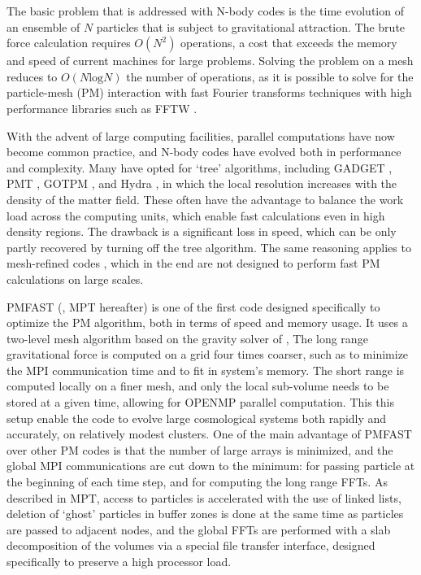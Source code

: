 The basic problem that is addressed with N-body codes is the time evolution of an ensemble of $N$ particles
that is subject to gravitational attraction. The brute force calculation requires $O(N^{2})$ operations, a cost that 
exceeds the memory and speed of current machines for large problems.
Solving the problem  on a mesh \citep{1981csup.book.....H} reduces to $O(N\mbox{log}N)$ the number of operations,
as it is possible to solve for the particle-mesh (PM) interaction with fast Fourier transforms techniques with high performance libraries such as {\small FFTW} \citep{FFTW3}.


With the advent of large computing facilities, parallel computations have now become 
common practice, and N-body codes have evolved both in performance and complexity. 
Many have opted for  `tree' algorithms, including {\small GADGET} \citep{2001NewA....6...79S, 2005MNRAS.364.1105S}, {\small PMT} \citep{1995ApJS...98..355X}, {\small GOTPM} \citep{2004NewA....9..111D}, and Hydra \citep{1995ApJ...452..797C}, in which the local resolution increases with the density of the matter field. 
These often have the advantage to balance the work load across the computing units, which enable fast calculations even in high density regions. 
The drawback is a significant loss in speed, which can be only partly recovered by turning off the tree algorithm. 
The same reasoning applies to mesh-refined codes  \citep{1991ApJ...368L..23C}, 
which in the end are not designed to perform fast PM calculations on large scales. 



{\small PMFAST} (\cite{2005NewA...10..393M}, MPT hereafter) is one of the first code designed specifically to optimize the PM algorithm,
both in terms of speed and memory usage. It uses a two-level mesh algorithm based on the gravity solver of \cite{2003AAS...203.9703T},
The long range gravitational force is computed on a  grid four times coarser, such as to minimize the {\small MPI} communication time
and to fit in system's memory. The short range is computed locally on a finer mesh, and only the local sub-volume needs 
to be stored at a given time, allowing for {\small OPENMP} parallel computation.
This this setup enable the code to evolve large cosmological systems both rapidly and accurately, on relatively modest clusters.
One of the main advantage of {\small PMFAST} over other PM codes is that the number of large arrays is minimized,
and the global {\small MPI} communications are cut down to the minimum: for passing particle at the beginning of each time step,
and  for computing the long range FFTs.
As described in MPT, access to particles is accelerated with the use of linked lists, deletion of `ghost' particles
in buffer zones is done at the same time as particles are passed to adjacent nodes,
and the global FFTs are performed with a slab decomposition of the volumes via a special file transfer interface, 
designed specifically to preserve a high processor load.

